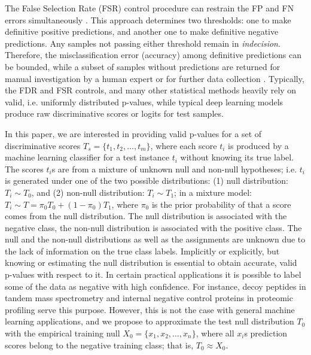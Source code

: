 \documentclass[10pt,letterpaper]{article}
\begin{document}
The False Selection Rate (FSR) control procedure can restrain the FP and FN errors simultaneously \cite{zhao2023controlling}.
This approach determines two thresholds: one to make definitive positive predictions, and another one to make definitive negative predictions.
Any samples not passing either threshold remain in {\em indecision}.
Therefore, the misclassification error (accuracy) among definitive predictions can be bounded, while a subset of samples without predictions are returned for manual investigation by a human expert or for further data collection \cite{rava2021burden}.
Typically, the FDR and FSR controls, and many other statistical methods heavily rely on valid, i.e. uniformly distributed p-values, while typical deep learning models produce raw discriminative scores or logits for test samples. 

In this paper, we are interested in providing valid p-values for a set of discriminative scores $T_s=\{t_1, t_2, \dots, t_m\}$, where each score $t_i$ is produced by a machine learning classifier for a test instance $t_i$ without knowing its true label.
The scores $t_i$s are from a mixture of unknown null and non-null hypotheses; i.e. $t_i$ is generated under one of the two possible distributions: (1) null distribution: $T_i\sim T_0$, and (2) non-null distribution: $T_i\sim T_1$; in a mixture model: $T_i\sim T=\pi_0 T_0 + (1-\pi_0)T_1$, where $\pi_0$ is the prior probability of that a score comes from the null distribution.
The null distribution is associated with the negative class, the non-null distribution is associated with the positive class.
The null and the non-null distributions as well as the assignments are unknown due to the lack of information on the true class labels.
Implicitly or explicitly, but knowing or estimating the null distribution is essential to obtain accurate, valid p-values with respect to it.
In certain practical applications it is possible to label some of the data as negative with high confidence.
For instance, decoy peptides \cite{elias2007target} in tandem mass spectrometry and internal negative control proteins \cite{gao2023simultaneous} in proteomic profiling serve this purpose.
However, this is not the case with general machine learning applications, and we propose to approximate the test null distribution $T_0$ with the empirical training null $X_0 = \{x_1, x_2, \dots, x_n\}$, where all $x_i$s prediction scores belong to the negative training class; that is, $T_0 \approx X_0 $.
  
\end{document}
